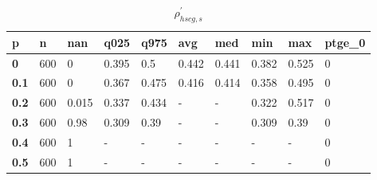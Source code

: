 \begin{table}[h]
 \centering 
\footnotesize
\caption{$\rho_{hscg,s}^\prime $}
\label{tab:alphahscgs}
\begin{tabular}[h]{|l|l|l|l|l|l|l|l|l|l|
    } \hline
\textbf{ p} & \textbf{ n} & \textbf{ nan} & \textbf{ q025} & \textbf{ q975} & \textbf{ avg} & \textbf{ med} & \textbf{ min} & \textbf{ max} & \textbf{ ptge\_0}
    \\ \hline
  \textbf{  0} & 600 &     0 & 0.395 &   0.5 & 0.442 & 0.441 & 0.382 & 0.525 & 0
    \\ \hline
  \textbf{0.1} & 600 &     0 & 0.367 & 0.475 & 0.416 & 0.414 & 0.358 & 0.495 & 0
    \\ \hline
  \textbf{0.2} & 600 & 0.015 & 0.337 & 0.434 & - & - & 0.322 & 0.517 & 0
    \\ \hline
  \textbf{0.3} & 600 &  0.98 & 0.309 &  0.39 & - & - & 0.309 &  0.39 & 0
    \\ \hline
  \textbf{0.4} & 600 &     1 & - & - & - & - & - & - & 0
    \\ \hline
  \textbf{0.5} & 600 &     1 & - & - & - & - & - & - & 0
    \\ \hline
 \end{tabular}
 \end{table}

